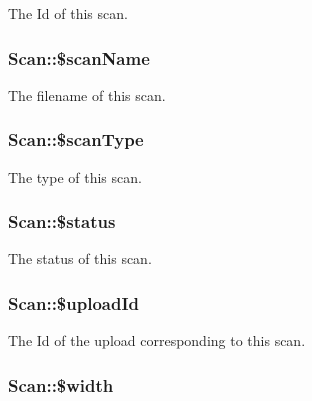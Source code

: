 \label{classScan_a4a0ff118e90fc192615f59bbb32e5a7e}
The Id of this scan. \hypertarget{classScan_a2762cebb2c691ca93dd6c5866a2d4fcd}{
\subsubsection[{\$scanName}]{\setlength{\rightskip}{0pt plus 5cm}Scan::\$scanName}}
\label{classScan_a2762cebb2c691ca93dd6c5866a2d4fcd}
The filename of this scan. \hypertarget{classScan_a16f9fddedd31312186eacf832862a140}{
\subsubsection[{\$scanType}]{\setlength{\rightskip}{0pt plus 5cm}Scan::\$scanType}}
\label{classScan_a16f9fddedd31312186eacf832862a140}
The type of this scan. \hypertarget{classScan_a792a6afa609cf3facf8162de86cb2299}{
\subsubsection[{\$status}]{\setlength{\rightskip}{0pt plus 5cm}Scan::\$status}}
\label{classScan_a792a6afa609cf3facf8162de86cb2299}
The status of this scan. \hypertarget{classScan_a018817763039daa0dcbc13b97badfa4a}{
\subsubsection[{\$uploadId}]{\setlength{\rightskip}{0pt plus 5cm}Scan::\$uploadId}}
\label{classScan_a018817763039daa0dcbc13b97badfa4a}
The Id of the upload corresponding to this scan. \hypertarget{classScan_a9d74b1c9b56be79120ff60afea7260c6}{
\subsubsection[{\$width}]{\setlength{\rightskip}{0pt plus 5cm}Scan::\$width}}
